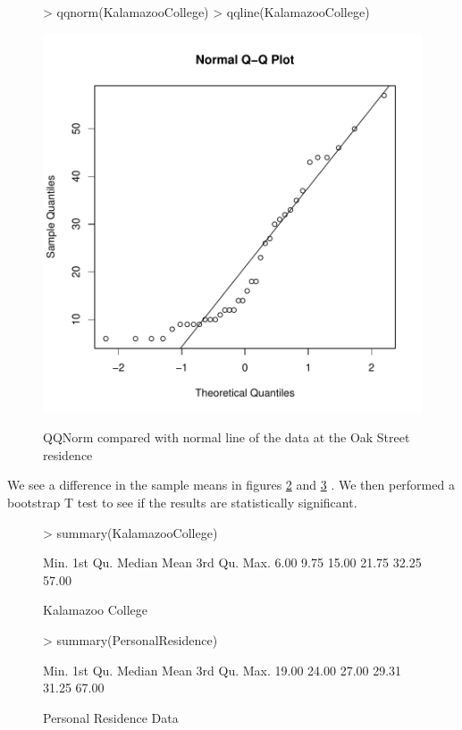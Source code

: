 \documentclass{article}
\begin{document}
\begin{figure}
\centering
\caption{QQNorm compared with normal line of the data at the Oak Street residence}
\begin{Schunk}
\begin{Sinput}
> qqnorm(KalamazooCollege)
> qqline(KalamazooCollege)
\end{Sinput}
\end{Schunk}
\includegraphics{FinalProjectPingTimes-005}
\label{kzooNorm}
\end{figure}


We see a difference in the sample means in figures \ref{kzooSum} and \ref{oakSum} . We then performed a bootstrap T test to see if the results are statistically significant.
\begin{figure}
\centering
\caption{Kalamazoo College}
\begin{Schunk}
\begin{Sinput}
> summary(KalamazooCollege)
\end{Sinput}
\begin{Soutput}
   Min. 1st Qu.  Median    Mean 3rd Qu.    Max. 
   6.00    9.75   15.00   21.75   32.25   57.00 
\end{Soutput}
\end{Schunk}
\label{kzooSum}
\end{figure}
\begin{figure}
\centering
\caption{Personal Residence Data}
\begin{Schunk}
\begin{Sinput}
> summary(PersonalResidence)
\end{Sinput}
\begin{Soutput}
   Min. 1st Qu.  Median    Mean 3rd Qu.    Max. 
  19.00   24.00   27.00   29.31   31.25   67.00 
\end{Soutput}
\end{Schunk}
\label{oakSum}
\end{figure}
\end{document}
